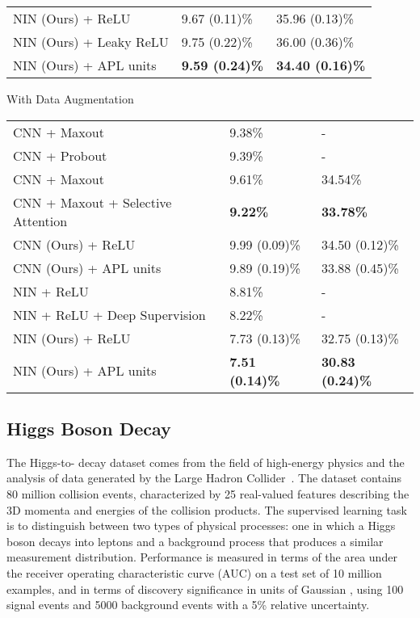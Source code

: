 \documentclass{article} \usepackage{iclr2015,times}
\begin{document}
\begin{table}[h]
\begin{center}
\begin{tabular}{p{8.4cm}p{2.2cm}p{2.2cm}}
NIN (Ours) + ReLU  & 9.67 (0.11)\%   &  35.96 (0.13)\% \\
NIN (Ours) + Leaky ReLU &  9.75 (0.22)\%  &  36.00 (0.36)\%  \\
NIN (Ours) + APL units & \bf9.59 (0.24)\% &  \bf34.40 (0.16)\%   \\
\hline
\end{tabular}
With Data Augmentation
\begin{tabular}{p{8.4cm}p{2.2cm}p{2.2cm}}
\hline
CNN + Maxout \citep{goodfellow2013maxout} & 9.38\% & - \\
CNN + Probout \citep{springenberg2013improving} & 9.39\% & - \\
CNN + Maxout \citep{stollenga2014deep} & 9.61\% & 34.54\% \\
CNN + Maxout + Selective Attention \citep{stollenga2014deep} & \bf9.22\% & \bf33.78\% \\
CNN (Ours) + ReLU  &  9.99 (0.09)\%  & 34.50 (0.12)\%  \\
CNN (Ours) + APL units  &  9.89 (0.19)\%  &33.88 (0.45)\%  \\
\hline
NIN + ReLU \citep{lin2013network} & 8.81\% & - \\
NIN + ReLU + Deep Supervision \citep{lee2014deeply} & 8.22\% & - \\
NIN (Ours) + ReLU & 7.73 (0.13)\%   & 32.75 (0.13)\%  \\
NIN (Ours) + APL units & \bf7.51 (0.14)\%  &  \bf30.83 (0.24)\%   \\
\hline
\end{tabular}
\end{center}
\end{table}






\subsection{Higgs Boson Decay}
The Higgs-to- decay dataset comes from the field of high-energy physics and the analysis of data generated by the Large Hadron Collider~\citep{baldi2014enhanced}. The dataset contains 80 million collision events, characterized by 25 real-valued features describing the 3D momenta and energies of the collision products. The supervised learning task is to distinguish between two types of physical processes: one in which a Higgs boson decays into  leptons and a background process that produces a similar measurement distribution. Performance is measured in terms of the area under the receiver operating characteristic curve (AUC) on a test set of 10 million examples, and in terms of discovery significance \citep{Cowan2010js} in units of Gaussian , using 100 signal events and 5000 background events with a 5\% relative uncertainty.
 
\end{document}
